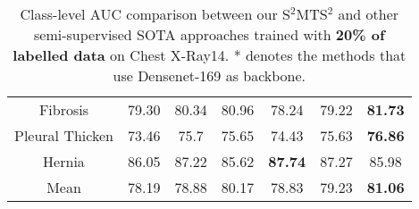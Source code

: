 \documentclass[runningheads]{llncs}
\begin{document}
\begin{table}[t!]
{\begin{tabular}{@{}c|c|c|c|c|c|c@{}}
Fibrosis        &      79.30                              & 80.34            &     80.96           & 78.24       & 79.22           &        \textbf{ 81.73 }   \\
Pleural Thicken &       73.46                             & 75.7             &      75.65          & 74.43       & 75.63           &       \textbf{  76.86 }   \\
Hernia          &      86.05                             & 87.22            &       85.62         & \textbf{87.74 }      & 87.27           &        85.98     \\ \hline 
Mean            &     78.19                               & 78.88            &       80.17         & 78.83       & 79.23           &        \textbf{81.06}     \\ \hline \bottomrule
\end{tabular}}
\caption{Class-level AUC comparison between our S$^2$MTS$^2$ and other semi-supervised SOTA approaches trained with \textbf{20\% of labelled data} on Chest X-Ray14. * denotes the methods that use Densenet-169 as backbone.} \vspace{-.2in}
\label{tab:semi-results}
\end{table}
\end{document}
